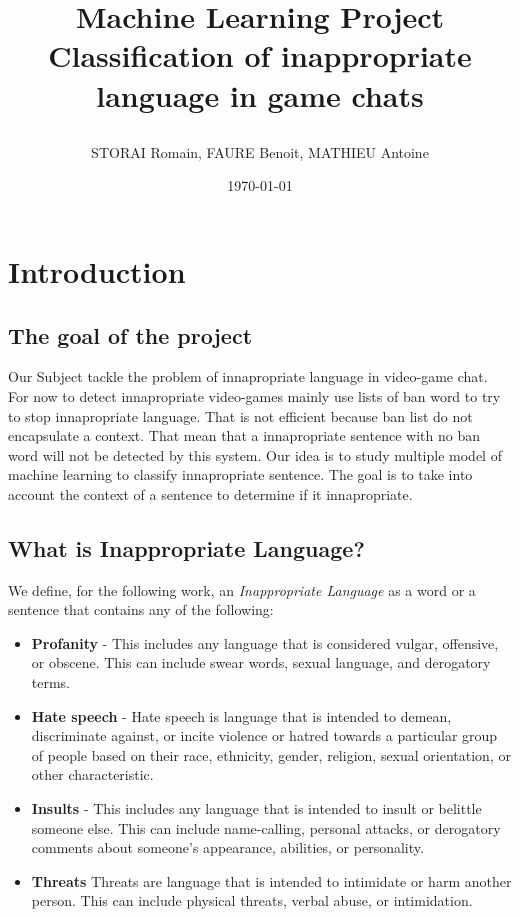 \documentclass[11pt,a4paper]{article}
\title{%
    \begin{minipage}\linewidth
        \centering\bfseries\sffamily
        Machine Learning Project
        \vskip 3pt
        \large Classification of inappropriate language in game chats
    \end{minipage}
}
\author{ STORAI Romain, FAURE Benoit, MATHIEU Antoine }
\date{\today}
\begin{document}
\maketitle	

\tableofcontents
\pagebreak

\section{Introduction}

\subsection{The goal of the project}
Our Subject tackle the problem of innapropriate language in video-game chat. For now to detect innapropriate video-games mainly use lists of ban word to try to stop innapropriate language. That is not efficient because ban list do not encapsulate a context. That mean that a innapropriate sentence with no ban word will not be detected by this system. Our idea is to study multiple model  of machine learning to classify innapropriate sentence. The goal is to take into account the context of a sentence to determine if it innapropriate.   

\subsection{What is Inappropriate Language?}
We define, for the following work, an \textit{Inappropriate Language} as a word or a sentence that contains any of the following:\\

\begin{itemize}
  \item \textbf{Profanity} - This includes any language that is considered vulgar, offensive, or obscene. This can include swear words, sexual language, and derogatory terms.
  \item \textbf{Hate speech} - Hate speech is language that is intended to demean, discriminate against, or incite violence or hatred towards a particular group of people based on their race, ethnicity, gender, religion, sexual orientation, or other characteristic.
  \item \textbf{Insults} - This includes any language that is intended to insult or belittle someone else. This can include name-calling, personal attacks, or derogatory comments about someone's appearance, abilities, or personality.
  \item \textbf{Threats} Threats are language that is intended to intimidate or harm another person. This can include physical threats, verbal abuse, or intimidation.
\end{itemize}
\end{document}
